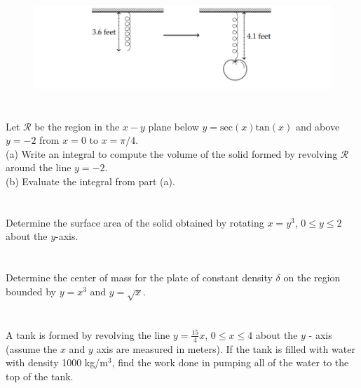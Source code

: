 \documentclass[11pt]{article}
\begin{document}
\begin{figure}
\centering
\includegraphics[scale=0.65]{Spring Mass.png}
\end{figure}

\section{}

Let $\mathcal{R}$ be the region in the $x-y$ plane below $y = \text{sec}(x)\text{tan}(x)$ and above $y = -2$ from $x = 0$ to $x = \pi/4$. \\

(a) Write an integral to compute the volume of the solid formed by revolving $\mathcal{R}$ around the line $y = -2$. \\

(b) Evaluate the integral from part (a). 

\section{}

Determine the surface area of the solid obtained by rotating $x = y^3$, $0\leq y \leq 2$ about the $y$-axis. 

\section{}

Determine the center of mass for the plate of constant density $\delta$ on the region bounded by $y = x^3$ and $y = \sqrt{x}$.

\section{}

A tank is formed by revolving the line $y = \frac{15}{4}x$, $0\leq x \leq 4$ about the $y$ - axis (assume the $x$ and $y$ axis are measured in meters). If the tank is filled with water with density 1000 kg/m$^3$, find the work done in pumping all of the water to the top of the tank.
\end{document}
